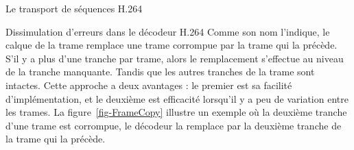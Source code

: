 \documentclass[letterpaper, twoside, 12pt,memoire]{thETS}
\newcommand{\fig}[1]{figure~\ref{#1}}
\providecommand{\DIFadd}[1]{{\protect\color{blue}\uwave{#1}}} %
\providecommand{\DIFaddbegin}{} %
\providecommand{\DIFaddend}{} %
\begin{document}
\begin{chapter}{Le transport de séquences H.264}
\begin{section}{Dissimulation d'erreurs dans le décodeur H.264}
Comme son nom l'indique, le calque de la trame remplace une trame corrompue par
la trame qui la précède. S'il y a plus d'une tranche par trame, alors le
remplacement s'effectue au niveau de la tranche manquante. Tandis que les autres
tranches de la trame sont intactes. Cette approche a deux avantages : le premier
est sa facilité d'implémentation, et le deuxième est \DIFaddbegin \DIFadd{son }\DIFaddend efficacité lorsqu'il y a
peu de variation entre les trames. La \fig{fig-FrameCopy} illustre un exemple où
la deuxième tranche d'une trame est corrompue, le décodeur la remplace par la
deuxième tranche de la trame qui la précède.

\begin{figure}[htb] 
\end{figure}
\end{section}
\end{chapter}
\end{document}

